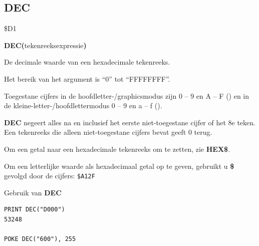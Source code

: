 \subsection{DEC}
\begin{description}[leftmargin=2cm,style=nextline]
\item [Token:]    \$D1

\item [Formaat:]   {\bf DEC(}tekenreeksexpressie{\bf)}

\item [Retourneert:]  De decimale waarde van een hexadecimale tekenreeks.

                  Het bereik van het argument is ``0'' tot ``FFFFFFFF''.

\item [Opmerkingen:]  Toegestane cijfers in de hoofdletter-/graphicsmodus zijn 0 -- 9 en A -- F () en in de kleine-letter-/hoofdlettermodus 0 -- 9 en a -- f ().

                  {\bf DEC} negeert alles na en inclusief het eerste niet-toegestane cijfer of het 8e teken. Een tekenreeks die alleen niet-toegestane cijfers bevat geeft 0 terug.

                  Om een getal naar een hexadecimale tekenreeks om te zetten, zie {\bf HEX\$}.

                  Om een letterlijke waarde als hexadecimaal getal op te geven, gebruikt u {\bf \$} gevolgd door de cijfers: \texttt{\$A12F}

\item [Voorbeelden:] Gebruik van {\bf DEC}

\begin{tcolorbox}[colback=black,coltext=white]
\verbatimfont{\codefont}
\begin{verbatim}
PRINT DEC("D000")
53248

POKE DEC("600"), 255
\end{verbatim}
\end{tcolorbox}
\end{description}


\newpage
